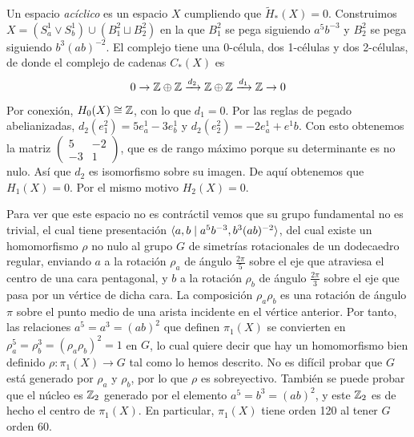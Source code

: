 \documentclass[TA.tex]{subfiles}
\begin{document}
\begin{ej}
Un espacio \emph{acíclico} es un espacio $X$ cumpliendo que $\widetilde{H}_*(X)=0$. Construimos $X=(S^1_a\vee S^1_b)\cup (B_1^2\sqcup B^2_2)$ en la que $B_1^2$ se pega siguiendo $a^5b^{-3}$ y $B_2^2$ se pega siguiendo $b^3(ab)^{-2}$. El complejo tiene una 0-célula, dos 1-células y dos 2-células, de donde el complejo de cadenas $C_*(X)$ es
\[
0\to \mathbb{Z}\oplus\mathbb{Z}\xrightarrow{d_2}\mathbb{Z}\oplus\mathbb{Z}\xrightarrow{d_1}\mathbb{Z}\to 0
\]
Por conexión, $H_0(X)\cong\mathbb{Z}$, con lo que $d_1=0$. Por las reglas de pegado abelianizadas, $d_2(e^2_1)=5e^1_a-3e_b^1$ y $d_2(e^2_2)=-2e_a^1+e^1b$. Con esto obtenemos la matriz $\begin{pmatrix}
5 & -2\\
-3 & 1
\end{pmatrix}$, que es de rango máximo porque su determinante es no nulo. Así que $d_2$ es isomorfismo sobre su imagen. De aquí obtenemos que $H_1(X)=0$. Por el mismo motivo $H_2(X)=0$. 

Para ver que este espacio no es contráctil vemos que su grupo fundamental no es trivial, el cual tiene presentación $\langle{a,b\mid a^5b^{-3}, b^3(ab)^{-2}}\rangle$, del cual existe un homomorfismo $\rho$ no nulo al grupo $G$ de simetrías rotacionales de un dodecaedro regular, enviando $a$ a la rotación $\rho_a$ de ángulo $\frac{2\pi}{5}$ sobre el eje que atraviesa el centro de una cara pentagonal, y $b$ a la rotación $\rho_b$ de ángulo $\frac{2\pi}{3}$ sobre el eje que pasa por un vértice de dicha cara. La composición $\rho_a\rho_b$ es una rotación de ángulo $\pi$ sobre el punto medio de una arista incidente en el vértice anterior. Por tanto, las relaciones $a^5=a^3=(ab)^2$ que definen $\pi_1(X)$ se convierten en $\rho_a^5=\rho_b^3=(\rho_a\rho_b)^2=1$ en $G$, lo cual quiere decir que hay un homomorfismo bien definido $\rho:\pi_1(X)\to G$ tal como lo hemos descrito. No es difícil probar que $G$ está generado por $\rho_a$ y $\rho_b$, por lo que $\rho$ es sobreyectivo. También se puede probar que el núcleo es $\mathbb{Z}_2$ generado por el elemento $a^5=b^3=(ab)^2$, y este $\mathbb{Z}_2$ es de hecho el centro de $\pi_1(X)$. En particular, $\pi_1(X)$ tiene orden 120 al tener $G$ orden 60.  
\end{ej}
\end{document}

